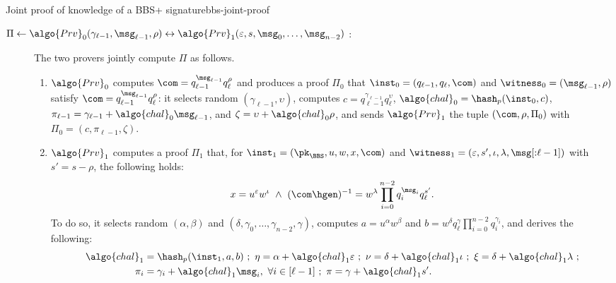 \begin{primitivebox}{Joint proof of knowledge of a BBS+
  signature}{bbs-joint-proof}

  \begin{description}

    \item[$\Pi \leftarrow \algo{Prv}_0(\gamma_{\ell-1}, \msg_{\ell-1}, \rho)
      \leftrightarrow \algo{Prv}_1(\varepsilon, s, \msg_0, \ldots, \msg_{n-2})$
      :] The two provers jointly compute $\Pi$ as follows.

      \begin{enumerate}

        \item $\algo{Prv}_0$ computes $\com = q_{\ell-1}^{\msg_{\ell-1}}
          q_\ell^\rho$ and produces a proof $\Pi_0$ that $\inst_0 =
          (q_{\ell-1}, q_\ell, \com)$ and $\witness_0 = (\msg_{\ell-1}, \rho)$
          satisfy $\com = q_{\ell-1}^{\msg_{\ell-1}} q_\ell^\rho$: it selects
          random $(\gamma_{\ell-1}, \upsilon)$, computes $c =
          q_{\ell-1}^{\gamma_{\ell-1}} q_\ell^\upsilon$, $\algo{chal}_0 =
          \hash_p(\inst_0, c)$, $\pi_{\ell-1} = \gamma_{\ell-1} + \algo{chal}_0
          \msg_{\ell-1}$, and $\zeta = \upsilon + \algo{chal}_0 \rho$, and
          sends $\algo{Prv}_1$ the tuple $(\com, \rho, \Pi_0)$ with $\Pi_0 =
          (c, \pi_{\ell-1}, \zeta)$.

        \item $\algo{Prv}_1$ computes a proof $\Pi_1$ that, for $\inst_1 =
          (\pk_{\BBS}, u, w, x, \com)$ and $\witness_1 = (\varepsilon, s',
          \iota, \lambda, \msg[{:}\ell-1])$ with $s' = s - \rho$, the following
          holds:
          \begin{equation} \label{eq:reljointproof}
            x = u^\varepsilon w^\iota \ \wedge \ (\com \hgen)^{-1} = w^\lambda
            \prod_{i=0}^{n-2} q_i^{\msg_i} q_\ell^{s'}.
          \end{equation}
          To do so, it selects random $(\alpha, \beta)$ and $(\delta, \gamma_0,
          \ldots, \gamma_{n-2}, \gamma)$, computes $a = u^\alpha w^\beta$ and
          $b = w^\delta q_\ell^\gamma \prod_{i=0}^{n-2} q_i^{\gamma_i}$, and
          derives the following:
          \begin{align*} \algo{chal}_1 &= \hash_p(\inst_1, a, b) \ ; \ \eta =
            \alpha + \algo{chal}_1 \varepsilon \ ; \ \nu = \delta +
            \algo{chal}_1 \iota \ ; \ \xi = \delta + \algo{chal}_1 \lambda \ ;
            \\
            \pi_i &= \gamma_i + \algo{chal}_1 \msg_i, \ \forall i \in [\ell-1]
            \ ; \ \pi = \gamma + \algo{chal}_1 s'.
          \end{align*}


\end{enumerate}
\end{description}
\end{primitivebox}
